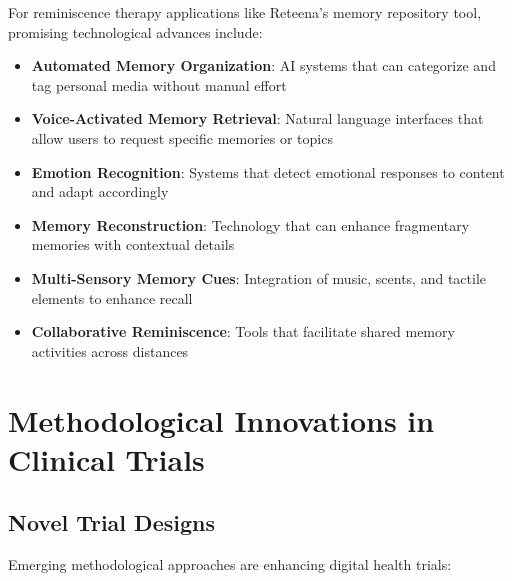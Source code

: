 \begin{tcolorbox}[infobox, title=Emerging Technologies for Reminiscence Therapy Applications]
For reminiscence therapy applications like Reteena's memory repository tool, promising technological advances include:
\begin{itemize}
    \item \textbf{Automated Memory Organization}: AI systems that can categorize and tag personal media without manual effort
    
    \item \textbf{Voice-Activated Memory Retrieval}: Natural language interfaces that allow users to request specific memories or topics
    
    \item \textbf{Emotion Recognition}: Systems that detect emotional responses to content and adapt accordingly
    
    \item \textbf{Memory Reconstruction}: Technology that can enhance fragmentary memories with contextual details
    
    \item \textbf{Multi-Sensory Memory Cues}: Integration of music, scents, and tactile elements to enhance recall
    
    \item \textbf{Collaborative Reminiscence}: Tools that facilitate shared memory activities across distances
\end{itemize}
\end{tcolorbox}

\section{Methodological Innovations in Clinical Trials}
\subsection{Novel Trial Designs}
Emerging methodological approaches are enhancing digital health trials:

